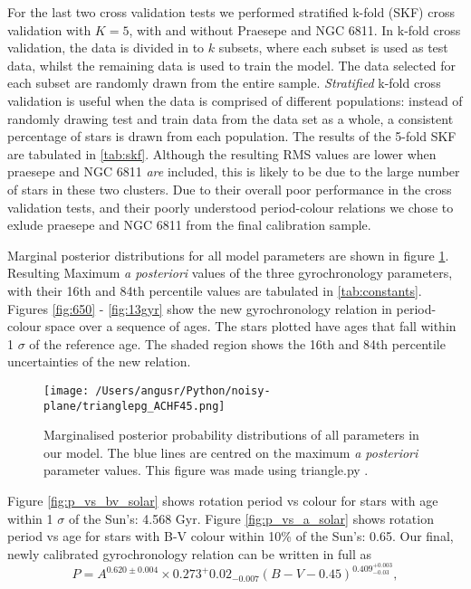 \documentclass[10pt,preprint]{aastex}
\begin{document}
For the last two cross validation tests we performed stratified k-fold (SKF) cross validation with $K=5$, with and without Praesepe and NGC 6811.
In k-fold cross validation, the data is divided in to $k$ subsets, where each subset is used as test data, whilst the remaining data is used to train the model.
The data selected for each subset are randomly drawn from the entire sample.
\emph{Stratified} k-fold cross validation is useful when the data is comprised of different populations: instead of randomly drawing test and train data from the data set as a whole, a consistent percentage of stars is drawn from each population.
The results of the 5-fold SKF are tabulated in \ref{tab:skf}.
Although the resulting RMS values are lower when praesepe and NGC 6811 \emph{are} included, this is likely to be due to the large number of stars in these two clusters.
Due to their overall poor performance in the cross validation tests, and their poorly understood period-colour relations we chose to exlude praesepe and NGC 6811 from the final calibration sample.

Marginal posterior distributions for all model parameters are shown in figure \ref{fig:triangle_full}.
Resulting Maximum \emph{a posteriori} values of the three gyrochronology parameters, with their 16th and 84th percentile values are tabulated in \ref{tab:constants}.
Figures \ref{fig:650} - \ref{fig:13gyr} show the new gyrochronology relation in period-colour space over a sequence of ages.
The stars plotted have ages that fall within 1 $\sigma$ of the reference age.
The shaded region shows the 16th and 84th percentile uncertainties of the new relation.
\begin{figure}[ht]
\begin{center}
\texttt{[image: /Users/angusr/Python/noisy-plane/trianglepg\_ACHF45.png]}
\caption{Marginalised posterior probability distributions of all parameters in our model. The blue lines are centred on the maximum \emph{a posteriori} parameter values. This figure was made using triangle.py \citep{Foreman-Mackey_triangle}.}
\label{fig:triangle_full}
\end{center}
\end{figure}
Figure \ref{fig:p_vs_bv_solar} shows rotation period vs colour for stars with age within 1 $\sigma$ of the Sun's: 4.568 Gyr.
Figure \ref{fig:p_vs_a_solar} shows rotation period vs age for stars with B-V colour within 10\% of the Sun's: 0.65.
Our final, newly calibrated gyrochronology relation can be written in full as
\begin{equation}
	P = A^{0.620 \pm 0.004} \times 0.273^+{0.02}_{-0.007}(B-V-0.45)^{0.409^{+0.003}_{-0.03}},
\label{eq:Barnes2007_2}
\end{equation}
\end{document}
